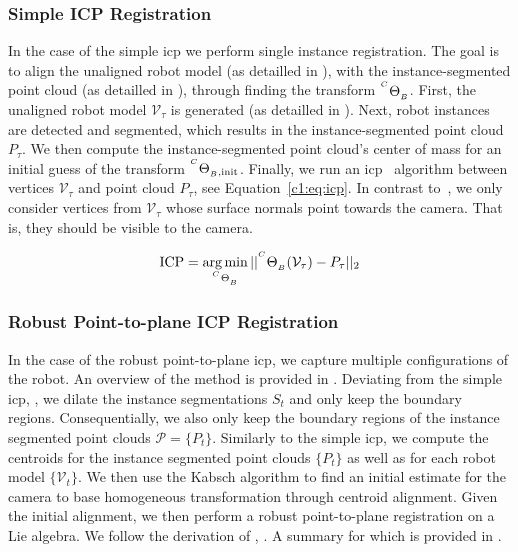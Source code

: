 \subsubsection{Simple ICP Registration}
\label{c1:sec:simple_icp_registration}
In the case of the simple \acrshort{icp} we perform single instance registration. The goal is to align the unaligned robot model (as detailled in ), with the instance-segmented point cloud (as detailled in ), through finding the transform ${}^{^C}\Theta_{_B}$. First, the unaligned robot model $\mathcal{V}_\tau$ is generated (as detailled in ). Next, robot instances are detected and segmented, which results in the instance-segmented point cloud $P_\tau$. We then compute the instance-segmented point cloud's center of mass for an initial guess of the transform ${}^{^{C}}\Theta_{_B,\text{init}}$. Finally, we run an \acrshort{icp}~\cite{simple_icp} algorithm between vertices $\mathcal{V}_\tau$ and point cloud $P_\tau$, see Equation~\ref{c1:eq:icp}. In contrast to~\cite{simple_icp}, we only consider vertices from $\mathcal{V}_\tau$ whose surface normals point towards the camera. That is, they should be visible to the camera.

\begin{equation}
    \label{c1:eq:icp}
    \text{ICP} = \argmin_{\homogeneous{C}{B}} || \homogeneous{C}{B}(\mathcal{V}_\tau) - P_\tau||_2
\end{equation}

\subsubsection{Robust Point-to-plane ICP Registration}
\label{c1:sec:robust_icp}

In the case of the robust point-to-plane \acrshort{icp}, we capture multiple configurations of the robot. An overview of the method is provided in . Deviating from the simple \acrshort{icp}, , we dilate the instance segmentations $S_t$ and only keep the boundary regions. Consequentially, we also only keep the boundary regions of the instance segmented point clouds $\mathcal{P} = \{P_t\}$. Similarly to the simple \acrshort{icp}, we compute the centroids for the instance segmented point clouds $\{P_t\}$ as well as for each robot model $\{\mathcal{V}_t\}$. We then use the Kabsch algorithm to find an initial estimate for the camera to base homogeneous transformation through centroid alignment. Given the initial alignment, we then perform a robust point-to-plane registration on a Lie algebra. We follow the derivation of , . A summary for which is provided in .


